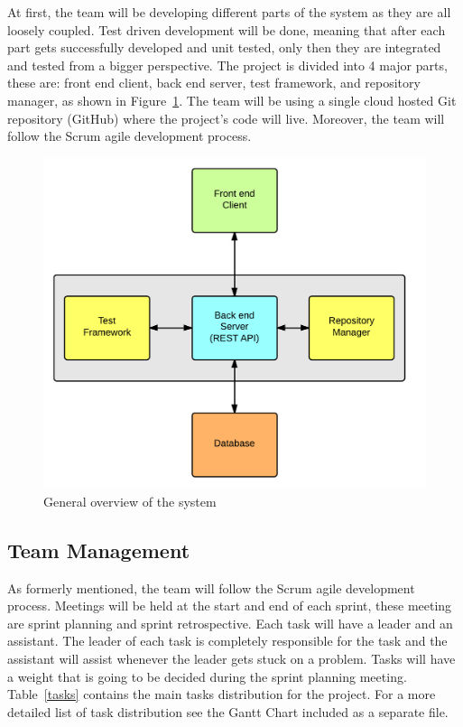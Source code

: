
At first, the team will be developing different parts of
the system as they are all loosely coupled. Test driven development will be
done, meaning that after each part gets successfully developed and unit tested,
only then they are integrated and tested from a bigger perspective. The project
is divided into 4 major parts, these are: front end client, back end server,
test framework, and repository manager, as shown in Figure~\ref{arqu}. The team
will be using a single cloud hosted Git repository (GitHub) where the project's
code will live. Moreover, the
team will follow the Scrum agile development process.

\begin{figure}[H]
	\centering
	\includegraphics[scale=0.15]{img/bigArquitectOverview}
	\caption{General overview of the system\label{arqu}}
\end{figure}

\subsection{Team Management}

As formerly mentioned, the team will follow the Scrum agile development process.
Meetings will be held at the start and end of each sprint, these meeting are
sprint planning and sprint retrospective. Each task will have a leader and an
assistant. The leader of each task is completely responsible for the task and
the assistant will assist whenever the leader gets stuck on a problem. Tasks
will have a weight that is going to be decided during the sprint planning
meeting. Table~\ref{tasks} contains the main tasks distribution for the project.
For a more detailed list of task distribution see the Gantt Chart included as a
separate file.

